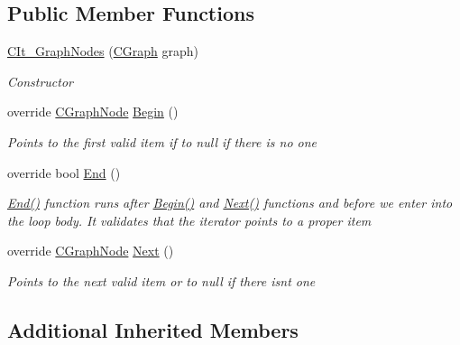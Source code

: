 \subsection*{Public Member Functions}
\begin{DoxyCompactItemize}
\item 
\hyperlink{class_graph_library_1_1_c_it___graph_nodes_aa4e91b5296c753d11ec54a7efe92efed}{C\+It\+\_\+\+Graph\+Nodes} (\hyperlink{class_graph_library_1_1_c_graph}{C\+Graph} graph)
\begin{DoxyCompactList}\small\item\em Constructor \end{DoxyCompactList}\item 
override \hyperlink{class_graph_library_1_1_c_graph_node}{C\+Graph\+Node} \hyperlink{class_graph_library_1_1_c_it___graph_nodes_a19eafdc8ea743803dddcc5a9a73adbf6}{Begin} ()
\begin{DoxyCompactList}\small\item\em Points to the first valid item if to null if there is no one \end{DoxyCompactList}\item 
override bool \hyperlink{class_graph_library_1_1_c_it___graph_nodes_abb9dc813b7bf7ff0aa0a22ef83ba3478}{End} ()
\begin{DoxyCompactList}\small\item\em \hyperlink{class_graph_library_1_1_c_it___graph_nodes_abb9dc813b7bf7ff0aa0a22ef83ba3478}{End()} function runs after \hyperlink{class_graph_library_1_1_c_it___graph_nodes_a19eafdc8ea743803dddcc5a9a73adbf6}{Begin()} and \hyperlink{class_graph_library_1_1_c_it___graph_nodes_a669edb9e8d59c4dcdbb70fe15e89104a}{Next()} functions and before we enter into the loop body. It validates that the iterator points to a proper item \end{DoxyCompactList}\item 
override \hyperlink{class_graph_library_1_1_c_graph_node}{C\+Graph\+Node} \hyperlink{class_graph_library_1_1_c_it___graph_nodes_a669edb9e8d59c4dcdbb70fe15e89104a}{Next} ()
\begin{DoxyCompactList}\small\item\em Points to the next valid item or to null if there isn\textquotesingle{}t one \end{DoxyCompactList}\end{DoxyCompactItemize}
\subsection*{Additional Inherited Members}


